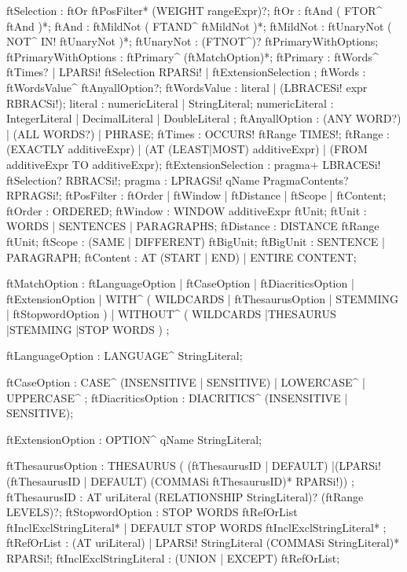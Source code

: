 ftSelection : ftOr ftPosFilter* (WEIGHT rangeExpr)?;
  ftOr : ftAnd ( FTOR^ ftAnd )*;
    ftAnd : ftMildNot ( FTAND^ ftMildNot )*;
      ftMildNot : ftUnaryNot ( NOT^ IN! ftUnaryNot )*;
        ftUnaryNot : (FTNOT^)? ftPrimaryWithOptions;
        ftPrimaryWithOptions : ftPrimary^ (ftMatchOption)*;
          ftPrimary : ftWords^ ftTimes? 
                    | LPARSi! ftSelection RPARSi! 
                    | ftExtensionSelection
                    ;
            ftWords : ftWordsValue^ ftAnyallOption?;
              ftWordsValue : literal | (LBRACESi! expr RBRACSi!);
                literal : numericLiteral | StringLiteral;
                  numericLiteral : IntegerLiteral 
                                 | DecimalLiteral 
                                 | DoubleLiteral
                                 ;
   ftAnyallOption : (ANY WORD?) | (ALL WORDS?) | PHRASE;
     ftTimes : OCCURS! ftRange TIMES!;
       ftRange : (EXACTLY additiveExpr)
               | (AT (LEAST|MOST) additiveExpr)
               | (FROM additiveExpr TO additiveExpr);
   ftExtensionSelection : pragma+ LBRACESi! ftSelection? RBRACSi!;
     pragma : LPRAGSi! qName PragmaContents? RPRAGSi!;
  ftPosFilter : ftOrder | ftWindow | ftDistance | ftScope | ftContent;
    ftOrder : ORDERED;
    ftWindow : WINDOW additiveExpr ftUnit;
      ftUnit : WORDS | SENTENCES | PARAGRAPHS;
    ftDistance : DISTANCE ftRange ftUnit;
    ftScope : (SAME | DIFFERENT) ftBigUnit;
      ftBigUnit : SENTENCE | PARAGRAPH;
    ftContent : AT (START | END) | ENTIRE CONTENT;

ftMatchOption : ftLanguageOption
              | ftCaseOption
              | ftDiacriticsOption
              | ftExtensionOption
              | WITH^ (
                WILDCARDS
                | ftThesaurusOption
                | STEMMING
                | ftStopwordOption
              )
              | WITHOUT^  (
                WILDCARDS
                |THESAURUS
                |STEMMING
                |STOP WORDS
              )
              ;

  ftLanguageOption : LANGUAGE^ StringLiteral;

  ftCaseOption : CASE^ (INSENSITIVE | SENSITIVE)
               | LOWERCASE^
               | UPPERCASE^
               ;
  ftDiacriticsOption : DIACRITICS^ (INSENSITIVE | SENSITIVE);

  ftExtensionOption : OPTION^ qName StringLiteral;

  ftThesaurusOption : THESAURUS  (
                      (ftThesaurusID | DEFAULT)
                      |(LPARSi! (ftThesaurusID | DEFAULT) 
                      (COMMASi ftThesaurusID)* RPARSi!))
                    ;
  ftThesaurusID : AT uriLiteral (RELATIONSHIP StringLiteral)? 
                  (ftRange LEVELS)?;
  ftStopwordOption : STOP WORDS ftRefOrList ftInclExclStringLiteral*
                   | DEFAULT STOP WORDS ftInclExclStringLiteral*
                   ;
  ftRefOrList : (AT uriLiteral)
              | LPARSi! StringLiteral (COMMASi StringLiteral)* RPARSi!;
  ftInclExclStringLiteral : (UNION | EXCEPT) ftRefOrList;

